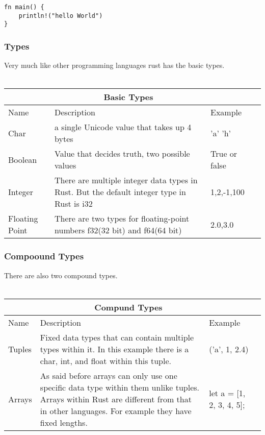 \documentclass{article}
\theoremstyle{theorem}
\theoremstyle{definition}
\theoremstyle{remark}
\begin{document}
\begin{lstlisting}
fn main() {
    println!("hello World")
}
\end{lstlisting}

\subsubsection{Types}

Very much like other programming languages rust has the basic types. \cite{PDT} 
 \\ 
  \\ 
\begin{center}
\begin{tabular}{ |p{5cm}||p{5cm}|p{5cm}|p{5cm}|  }
 \hline
 \multicolumn{3}{|c|}{Basic Types} \\
 \hline
 Name & Description & Example\\
 \hline
 Char   &  a single Unicode value that takes up 4 bytes
    &'a' 'h' \\
     \hline
 Boolean &  Value that decides truth, two possible values & True or false  \\
  \hline
 Integer &There are multiple integer data types in Rust. But the default integer type in Rust is i32
 & 1,2,-1,100\\
  \hline
 Floating Point    &There are two types for floating-point numbers f32(32 bit) and f64(64 bit) & 2.0,3.0\\
 \hline
\end{tabular}
\end{center}
\subsubsection{Compoound Types}
There are also two compound types. 
 \\ 
  \\ 
\begin{center}
\begin{tabular}{ |p{5cm}||p{5cm}|p{5cm}|p{5cm}|  }
 \hline
 \multicolumn{3}{|c|}{Compund Types} \\
 \hline
 Name & Description & Example\\
 \hline
 Tuples   & Fixed data types that can contain multiple types within it. In this example there is a char, int, and float within this tuple.
    &('a', 1, 2.4) \\
    \hline
 Arrays &  As said before arrays can only use one specific data type within them unlike tuples. Arrays within Rust are different from that in other languages. For example they have fixed lengths. & let a = [1, 2, 3, 4, 5]; \\
  \hline
\end{tabular}
\end{center}
\end{document}
